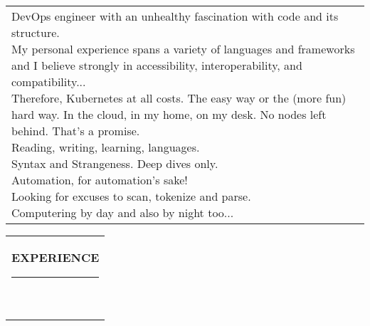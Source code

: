 \documentclass[10pt,A4]{article}
\newcommand{\mpwidth}{\linewidth-\fboxsep-\fboxsep}
\newcommand{\cvtext}[1] {
	\begin{tabular*}{1\mpwidth}{p{0.98\mpwidth}}
		\parbox{1\mpwidth}{#1}
	\end{tabular*}
}
\newcommand{\cvsection}[1] {
	\cvtext{
		\textbf{\LARGE{\textcolor{darkcol}{\uppercase{#1}}}}\\[-3pt] %
		\textcolor{maincol}{ \rule{0.1\textwidth}{2pt} } \\
	}
	\vspace{-8pt}
}
\begin{document}
\begin{paracol}{2}
\begin{rightcolumn}


\cvtext{\vspace{5pt}DevOps engineer with an unhealthy fascination with code and its structure.\\

My personal experience spans a variety of languages and frameworks and I believe strongly in accessibility, interoperability, and compatibility... \\
Therefore, Kubernetes at all costs. The easy way or the (more fun) hard way. In the cloud, in my home, on my desk. No nodes left behind. That's a promise.\\

Reading, writing, learning, languages. \\
Syntax and Strangeness. Deep dives only.\\ 
Automation, for automation's sake! \\
Looking for excuses to scan, tokenize and parse. \\
Computering by day and also by night too... \\}

\vspace{10pt}
\cvsection{EXPERIENCE}
\vspace{10pt}


\end{rightcolumn}
\end{paracol}
\end{document}
